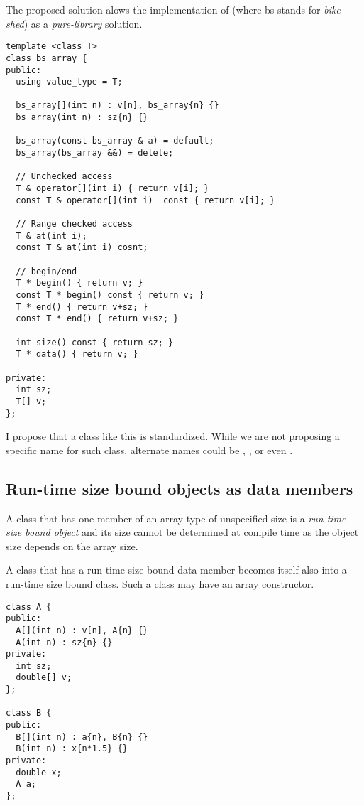 The proposed solution alows the implementation of 
(where bs stands for \emph{bike shed}) as a \emph{pure-library} solution.

\begin{lstlisting}
template <class T>
class bs_array {
public:
  using value_type = T;

  bs_array[](int n) : v[n], bs_array{n} {}
  bs_array(int n) : sz{n} {}

  bs_array(const bs_array & a) = default;
  bs_array(bs_array &&) = delete;

  // Unchecked access
  T & operator[](int i) { return v[i]; }
  const T & operator[](int i)  const { return v[i]; }

  // Range checked access
  T & at(int i);
  const T & at(int i) cosnt;

  // begin/end
  T * begin() { return v; }
  const T * begin() const { return v; }
  T * end() { return v+sz; }
  const T * end() { return v+sz; }

  int size() const { return sz; }
  T * data() { return v; }

private:
  int sz;
  T[] v;
};
\end{lstlisting}

I propose that a class like this is standardized. While we are not proposing a
specific name for such class, alternate names could be ,
,  or even .

\subsection{Run-time size bound objects as data members}

A class that has one member of an array type of unspecified size is a
\emph{run-time size bound object} and its size cannot be determined at compile
time as the object size depends on the array size.

A class that has a run-time size bound data member becomes itself also into a
run-time size bound class. Such a class may have an array constructor.

\begin{lstlisting}
class A {
public:
  A[](int n) : v[n], A{n} {}
  A(int n) : sz{n} {}
private:
  int sz;
  double[] v;
};

class B {
public:
  B[](int n) : a{n}, B{n} {}
  B(int n) : x{n*1.5} {}
private:
  double x;
  A a;
};
\end{lstlisting}

